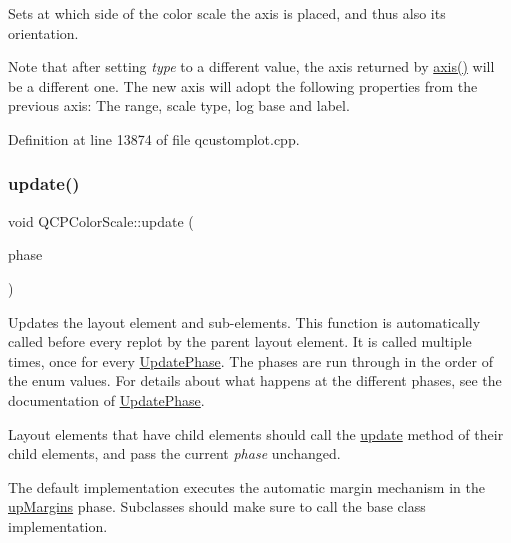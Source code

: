 Sets at which side of the color scale the axis is placed, and thus also its orientation.

Note that after setting {\itshape type} to a different value, the axis returned by \hyperlink{class_q_c_p_color_scale_a39bdbdb3b212602a5a57f9f3ea444190}{axis()} will be a different one. The new axis will adopt the following properties from the previous axis\+: The range, scale type, log base and label. 

Definition at line 13874 of file qcustomplot.\+cpp.

\mbox{\label{class_q_c_p_color_scale_ab8f6991ac88243fc582b44b183670334}} 
\subsubsection{\texorpdfstring{update()}{update()}}
{\footnotesize\ttfamily void Q\+C\+P\+Color\+Scale\+::update (\begin{DoxyParamCaption}\item[{\hyperlink{class_q_c_p_layout_element_a0d83360e05735735aaf6d7983c56374d}{Update\+Phase}}]{phase }\end{DoxyParamCaption})\hspace{0.3cm}{\ttfamily [virtual]}}

Updates the layout element and sub-\/elements. This function is automatically called before every replot by the parent layout element. It is called multiple times, once for every \hyperlink{class_q_c_p_layout_element_a0d83360e05735735aaf6d7983c56374d}{Update\+Phase}. The phases are run through in the order of the enum values. For details about what happens at the different phases, see the documentation of \hyperlink{class_q_c_p_layout_element_a0d83360e05735735aaf6d7983c56374d}{Update\+Phase}.

Layout elements that have child elements should call the \hyperlink{class_q_c_p_color_scale_ab8f6991ac88243fc582b44b183670334}{update} method of their child elements, and pass the current {\itshape phase} unchanged.

The default implementation executes the automatic margin mechanism in the \hyperlink{class_q_c_p_layout_element_a0d83360e05735735aaf6d7983c56374da288cb59a92280e47261a341f2813e676}{up\+Margins} phase. Subclasses should make sure to call the base class implementation. 

